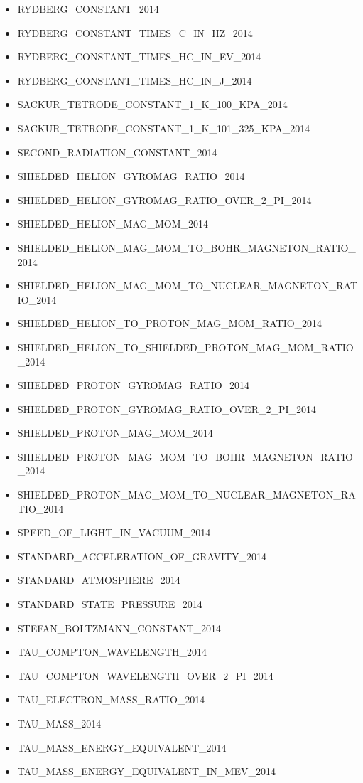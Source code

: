 \begin{itemize}
\item RYDBERG\_CONSTANT\_2014
\item RYDBERG\_CONSTANT\_TIMES\_C\_IN\_HZ\_2014
\item RYDBERG\_CONSTANT\_TIMES\_HC\_IN\_EV\_2014
\item RYDBERG\_CONSTANT\_TIMES\_HC\_IN\_J\_2014
\item SACKUR\_TETRODE\_CONSTANT\_1\_K\_100\_KPA\_2014
\item SACKUR\_TETRODE\_CONSTANT\_1\_K\_101\_325\_KPA\_2014
\item SECOND\_RADIATION\_CONSTANT\_2014
\item SHIELDED\_HELION\_GYROMAG\_RATIO\_2014
\item SHIELDED\_HELION\_GYROMAG\_RATIO\_OVER\_2\_PI\_2014
\item SHIELDED\_HELION\_MAG\_MOM\_2014
\item SHIELDED\_HELION\_MAG\_MOM\_TO\_BOHR\_MAGNETON\_RATIO\_2014
\item SHIELDED\_HELION\_MAG\_MOM\_TO\_NUCLEAR\_MAGNETON\_RATIO\_2014
\item SHIELDED\_HELION\_TO\_PROTON\_MAG\_MOM\_RATIO\_2014
\item SHIELDED\_HELION\_TO\_SHIELDED\_PROTON\_MAG\_MOM\_RATIO\_2014
\item SHIELDED\_PROTON\_GYROMAG\_RATIO\_2014
\item SHIELDED\_PROTON\_GYROMAG\_RATIO\_OVER\_2\_PI\_2014
\item SHIELDED\_PROTON\_MAG\_MOM\_2014
\item SHIELDED\_PROTON\_MAG\_MOM\_TO\_BOHR\_MAGNETON\_RATIO\_2014
\item SHIELDED\_PROTON\_MAG\_MOM\_TO\_NUCLEAR\_MAGNETON\_RATIO\_2014
\item SPEED\_OF\_LIGHT\_IN\_VACUUM\_2014
\item STANDARD\_ACCELERATION\_OF\_GRAVITY\_2014
\item STANDARD\_ATMOSPHERE\_2014
\item STANDARD\_STATE\_PRESSURE\_2014
\item STEFAN\_BOLTZMANN\_CONSTANT\_2014
\item TAU\_COMPTON\_WAVELENGTH\_2014
\item TAU\_COMPTON\_WAVELENGTH\_OVER\_2\_PI\_2014
\item TAU\_ELECTRON\_MASS\_RATIO\_2014
\item TAU\_MASS\_2014
\item TAU\_MASS\_ENERGY\_EQUIVALENT\_2014
\item TAU\_MASS\_ENERGY\_EQUIVALENT\_IN\_MEV\_2014

\end{itemize}
